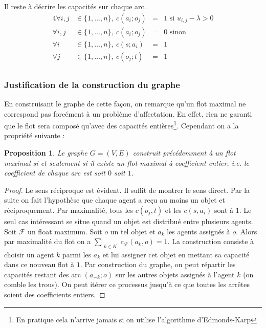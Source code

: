 \documentclass[a4paper, titlepage, oneside, 12pt]{article}%
\newtheorem{prop}{Proposition}
\begin{document}
Il reste à décrire les capacités sur chaque arc. 
\begin{alignat*}{4}
\forall i,j &\in \{1, \dots, n\},\ c(a_i;o_j)&=&1  \mbox{ si } u_{i,j}-\lambda>0\\
\forall i,j &\in \{1, \dots, n\},\ c(a_i;o_j)&=&0  \mbox{ sinon}\\
\forall i &\in \{1, \dots, n\},\ c(s;a_i)&=&1\\
\forall j &\in \{1, \dots, n\},\ c(o_j;t)&=&1\\
\end{alignat*}

\subsubsection{Justification de la construction du graphe}

En construisant le graphe de cette façon, on remarque qu'un flot maximal ne correspond pas forcément à un problème d'affectation. En effet, rien ne garanti que le flot sera composé qu'avec des capacités entières\footnote{En pratique cela n'arrive jamais si on utilise l'algorithme d'Edmonds-Karp}. Cependant on a la propriété suivante :

\begin{prop}
Le graphe $G=(V,E)$ construit précédemment à un flot maximal si et seulement si il existe un flot maximal à coefficient entier, i.e. le coefficient de chaque arc est soit $0$ soit $1$. 
\label{prop1}
\end{prop}

\begin{proof}
Le sens réciproque est évident. Il suffit de montrer le sens direct. Par la suite on fait l'hypothèse que chaque agent a reçu au moins un objet et réciproquement. Par maximalité, tous les $c(o_j,t)$ et les $c(s,a_i)$ sont à $1$. Le seul cas intéressant se situe quand un objet est distribué entre plusieurs agents. Soit $\mathcal{F}$ un float maximum. Soit $o$ un tel objet et $a_k$ les agents assignés à $o$. Alors par maximalité du flot on a $\sum_{\substack{k\in K}} c_{\mathcal{F}}(a_k,o)=1$. La construction consiste à choisir un agent $k$ parmi les $a_k$ et lui assigner cet objet en mettant sa capacité dans ce nouveau flot à $1$. Par construction du graphe, on peut répartir les capacités restant des arc $(a_{-k}; o)$ sur les autres objets assignés à l'agent $k$ (on comble les trous). On peut itérer ce processus jusqu'à ce que toutes les arrêtes soient des coefficients entiers.
\end{proof}
\end{document}
